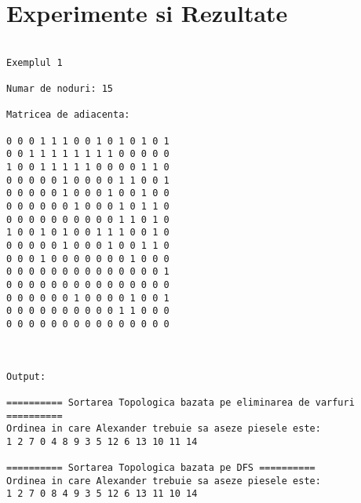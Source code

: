 \documentclass[14pt]{article}
\begin{document}
\section*{Experimente si Rezultate}
\begin{lstlisting}

Exemplul 1

Numar de noduri: 15

Matricea de adiacenta: 

0 0 0 1 1 1 0 0 1 0 1 0 1 0 1 
0 0 1 1 1 1 1 1 1 1 0 0 0 0 0 
1 0 0 1 1 1 1 1 0 0 0 0 1 1 0 
0 0 0 0 0 1 0 0 0 0 1 1 0 0 1 
0 0 0 0 0 1 0 0 0 1 0 0 1 0 0 
0 0 0 0 0 0 1 0 0 0 1 0 1 1 0 
0 0 0 0 0 0 0 0 0 0 1 1 0 1 0 
1 0 0 1 0 1 0 0 1 1 1 0 0 1 0 
0 0 0 0 0 1 0 0 0 1 0 0 1 1 0 
0 0 0 1 0 0 0 0 0 0 0 1 0 0 0 
0 0 0 0 0 0 0 0 0 0 0 0 0 0 1 
0 0 0 0 0 0 0 0 0 0 0 0 0 0 0 
0 0 0 0 0 0 1 0 0 0 0 1 0 0 1 
0 0 0 0 0 0 0 0 0 0 1 1 0 0 0 
0 0 0 0 0 0 0 0 0 0 0 0 0 0 0 



Output:

========== Sortarea Topologica bazata pe eliminarea de varfuri ==========
Ordinea in care Alexander trebuie sa aseze piesele este: 
1 2 7 0 4 8 9 3 5 12 6 13 10 11 14

========== Sortarea Topologica bazata pe DFS ==========
Ordinea in care Alexander trebuie sa aseze piesele este: 
1 2 7 0 8 4 9 3 5 12 6 13 11 10 14

\end{lstlisting}
\newpage
\end{document}
